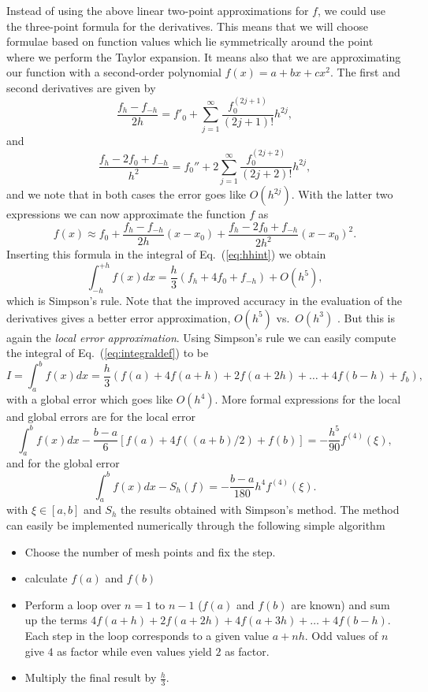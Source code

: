 Instead of using the above linear two-point approximations for $f$, we could
use the three-point formula for the derivatives. This means that we will choose
formulae based on function values which lie symmetrically around the point where
we perform the Taylor expansion. It means also that we 
are approximating our function with a second-order 
polynomial $f(x)=a+bx+cx^2$. The first and second 
derivatives are given by 
\[
   \frac{f_h-f_{-h}}{2h}=f'_0+\sum_{j=1}^{\infty}\frac{f_0^{(2j+1)}}{(2j+1)!}h^{2j},
\]
and
\[
 \frac{ f_h -2f_0 +f_{-h}}{h^2}=f_0''+2\sum_{j=1}^{\infty}\frac{f_0^{(2j+2)}}{(2j+2)!}h^{2j},
\]
and we note that in both cases the error goes like $O(h^{2j})$. 
With the latter two expressions we can now approximate  the function
$f$ as
\[
   f(x)\approx f_0 + \frac{f_h-f_{-h}}{2h}(x-x_0) + \frac{ f_h -2f_0 +f_{-h}}{2h^2}(x-x_0)^2. 
\]
Inserting this formula in the integral of Eq.\ (\ref{eq:hhint}) we obtain
\[
   \int_{-h}^{+h}f(x)dx=\frac{h}{3}\left(f_h + 4f_0 + f_{-h}\right)+O(h^5),
\]
which is Simpson's rule. Note that the improved accuracy in the evaluation of
the derivatives gives a better error approximation, $O(h^5)$ vs.\ $O(h^3)$ .
But this is again the {\em local error approximation}. 
Using Simpson's rule we can easily compute
the integral     of Eq.\ (\ref{eq:integraldef}) to be
\begin{equation}
   I=\int_a^bf(x) dx=\frac{h}{3}\left(f(a) + 4f(a+h) +2f(a+2h)+
                          \dots +4f(b-h)+ f_{b}\right),
   \label{eq:simpson}
\end{equation}
with a global error which goes like $O(h^4)$. 
More formal expressions for the local and global errors are for the local error
\[
\int_a^bf(x)dx -\frac{b-a}{6}\left[f(a)+4f((a+b)/2)+f(b)\right]=-\frac{h^5}{90}f^{(4)}(\xi),
\]
and for the global error
\[
\int_a^bf(x)dx -S_h(f)=-\frac{b-a}{180}h^4f^{(4)}(\xi).
\]
with $\xi\in[a,b]$ and $S_h$ the results obtained with Simpson's method.
The method 
can easily be implemented numerically through the following simple algorithm
\begin{svgraybox}
\begin{itemize}
   \item Choose the number of mesh points and fix the step.
   \item calculate $f(a)$ and $f(b)$
   \item Perform a loop over $n=1$ to $n-1$ ($f(a)$ and $f(b)$ are known) and sum up
         the terms $4f(a+h) +2f(a+2h)+4f(a+3h)+\dots +4f(b-h)$. Each step in the loop
         corresponds to a given value $a+nh$. Odd values of $n$ give $4$ as factor
         while even values yield $2$ as factor. 
   \item Multiply the final result by $\frac{h}{3}$.
\end{itemize}\end{svgraybox}


